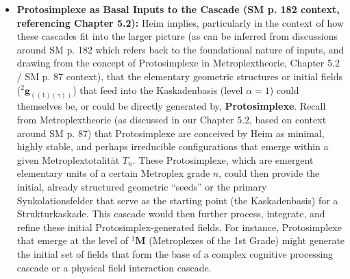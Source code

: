 \documentclass[12pt]{article}
\newcommand{\q}[1]{\enquote{#1}}
\newcommand{\metroplex}[1]{{}^{#1}\mathbf{M}}
\newcommand{\hypersyntrix}{\metroplex{1}}
\newcommand{\metroplextotalitaet}[1]{T_{#1}}
\newcommand{\partialstruktur}[1]{{}^2\mathbf{g}_{(#1)}}
\newcommand{\kaskadenstufe}{\alpha}
\begin{document}
\begin{itemize}
    \item \textbf{Protosimplexe as Basal Inputs to the Cascade (SM p. 182 context, referencing Chapter 5.2):}
    Heim implies, particularly in the context of how these cascades fit into the larger picture (as can be inferred from discussions around SM p. 182 which refers back to the foundational nature of inputs, and drawing from the concept of Protosimplexe in Metroplextheorie, Chapter 5.2 / SM p. 87 context), that the elementary geometric structures or initial fields (\( \partialstruktur{(1)(\gamma)} \)) that feed into the Kaskadenbasis (level \( \kaskadenstufe=1 \)) could themselves be, or could be directly generated by, \textbf{Protosimplexe}. Recall from Metroplextheorie (as discussed in our Chapter 5.2, based on context around SM p. 87) that Protosimplexe are conceived by Heim as minimal, highly stable, and perhaps irreducible configurations that emerge within a given Metroplextotalität \( \metroplextotalitaet{n} \). These Protosimplexe, which are emergent elementary units of a certain Metroplex grade \(n\), could then provide the initial, already structured geometric \q{seeds} or the primary Synkolationsfelder that serve as the starting point (the Kaskadenbasis) for a Strukturkaskade. This cascade would then further process, integrate, and refine these initial Protosimplex-generated fields. For instance, Protosimplexe that emerge at the level of \( \hypersyntrix \) (Metroplexes of the 1st Grade) might generate the initial set of fields that form the base of a complex cognitive processing cascade or a physical field interaction cascade.


\end{itemize}
\end{document}
